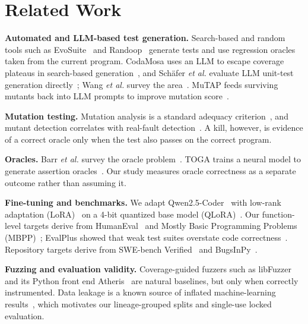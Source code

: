 \documentclass[10pt,conference,letterpaper]{IEEEtran}
\begin{document}
\section{Related Work}

\textbf{Automated and LLM-based test generation.} Search-based and random tools such
as EvoSuite~\cite{fraser2011evosuite} and Randoop~\cite{pacheco2007randoop} generate
tests and use regression oracles taken from the current program. CodaMosa uses an LLM
to escape coverage plateaus in search-based generation~\cite{lemieux2023codamosa}, and
Sch\"afer \emph{et al.} evaluate LLM unit-test generation directly~\cite{schafer2024llmunit};
Wang \emph{et al.} survey the area~\cite{wang2024testingsurvey}. MuTAP feeds surviving
mutants back into LLM prompts to improve mutation score~\cite{dakhel2024mutap}.

\textbf{Mutation testing.} Mutation analysis is a standard adequacy
criterion~\cite{jia2011mutation,papadakis2019mutation}, and mutant detection
correlates with real-fault detection~\cite{just2014mutants}. A kill, however, is
evidence of a correct oracle only when the test also passes on the correct program.

\textbf{Oracles.} Barr \emph{et al.} survey the oracle problem~\cite{barr2015oracle}.
TOGA trains a neural model to generate assertion oracles~\cite{dinella2022toga}. Our
study measures oracle correctness as a separate outcome rather than assuming it.

\textbf{Fine-tuning and benchmarks.} We adapt Qwen2.5-Coder~\cite{hui2024qwen25coder}
with low-rank adaptation (LoRA)~\cite{hu2021lora} on a 4-bit quantized base model
(QLoRA)~\cite{dettmers2023qlora}. Our function-level targets derive from
HumanEval~\cite{chen2021codex} and Mostly Basic Programming Problems
(MBPP)~\cite{austin2021mbpp}; EvalPlus showed that weak test suites overstate code
correctness~\cite{liu2023evalplus}. Repository targets derive from SWE-bench
Verified~\cite{jimenez2023swebench} and BugsInPy~\cite{widyasari2020bugsinpy}.

\textbf{Fuzzing and evaluation validity.} Coverage-guided fuzzers such as
libFuzzer~\cite{serebryany2016libfuzzer} and its Python front end
Atheris~\cite{atheris} are natural baselines, but only when correctly instrumented.
Data leakage is a known source of inflated machine-learning results~\cite{kapoor2023leakage},
which motivates our lineage-grouped splits and single-use locked evaluation.
\end{document}
